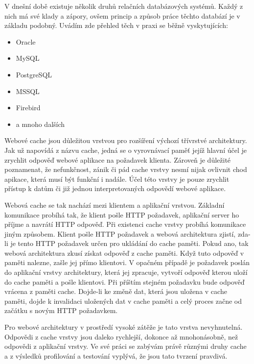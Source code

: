 \documentclass[12pt]{article}
\begin{document}
V dnešní době existuje několik druhů relačních databázových systémů. Každý z nich má své klady a zápory, ovšem princip a způsob práce těchto databází je v základu podobný. Uvádím zde přehled těch v praxi se běžně vyskytujících:

\begin{itemize}
\item Oracle
\item MySQL
\item PostgreSQL
\item MSSQL
\item Firebird
\item a mnoho dalších
\end{itemize}



Webové cache jsou důležitou vrstvou pro rozšíření výchozí třívrstvé architektury. Jak už napovídá z názvu cache, jedná se o vyrovnávací paměť jejíž hlavní účel je zrychlit odpověď webové aplikace na požadavek klienta. Zároveň je důležité poznamenat, že nefunkčnost, zánik či pád cache vrstvy nesmí nijak ovlivnit chod apikace, která musí být funkční i nadále. Účel této vrstvy je pouze zrychlit přístup k datům či již jednou interpretovaných odpovědí webové aplikace.

Webová cache se tak nachází mezi klientem a aplikační vrstvou. Základní komunikace probíhá tak, že klient pošle HTTP požadavek, aplikační server ho příjme a navrátí HTTP odpověď. Při existenci cache vrstvy probíhá komunikace jiným způsobem. Klient pošle HTTP požadavek a webová architektura zjistí, zda-li je tento HTTP požadavek určen pro ukládání do cache paměti. Pokud ano, tak webová architektura zkusí získat odpověď z cache paměti. Když tuto odpověď v paměti nalezne, zašle jej přímo klientovi. V opačném případě je požadavek poslán do aplikační vrstvy architektury, která jej zpracuje, vytvoří odpověď kterou uloží do cache paměti a pošle klientovi. Při příštím stejném požadavku bude odpověď vrácena z paměti cache. Dojde-li ke změně dat, která jsou uložena v cache paměti, dojde k invalidaci uložených dat v cache paměti a celý proces začne od začátku s novým HTTP požadavkem.

Pro webové architektury v prostředí vysoké zátěže je tato vrstva nevyhnutelná. Odpovědi z cache vrstvy jsou daleko rychlejší, dokonce až mnohonásobně, než odpovědi z aplikační vrstvy. Ve své práci se zabývám právě různými druhy cache a z výsledků profilování a testování vyplývá, že jsou tato tvrzení pravdivá.
\end{document}
